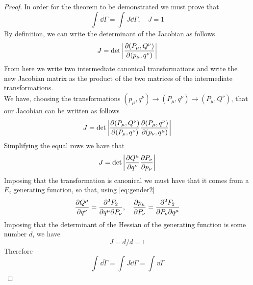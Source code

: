 \documentclass[../admech.tex]{subfiles}
\begin{document}
\begin{proof}
	In order for the theorem to be demonstrated we must prove that
	\begin{equation*}
		\int_{}^{}\dd\tilde{\Gamma}=\int_{}^{}J\dd\Gamma,\quad J=1
	\end{equation*}
	By definition, we can write the determinant of the Jacobian as follows
	\begin{equation*}
		J=\det\abs{\pdv{(P_\mu,Q^\nu)}{(p_\mu,q^\nu)}}
	\end{equation*}
	From here we write two intermediate canonical transformations and write the new Jacobian matrix as the product of the two matrices of the intermediate transformations.\\
	We have, choosing the transformations $(p_\mu,q^\nu)\to(P_\mu,q^\nu)\to(P_\mu,Q^\nu)$, that our Jacobian can be written as follows
	\begin{equation*}
		J=\det\abs{\pdv{(P_\mu,Q^\nu)}{(P_\mu,q^\nu)}\pdv{(P_\mu,q^\nu)}{(p_\nu,q^\mu)}}
	\end{equation*}
	Simplifying the equal rows we have that
	\begin{equation*}
		J=\det\abs{\pdv{Q^\mu}{q^\nu}\pdv{P_\nu}{p_\mu}}
	\end{equation*}
	Imposing that the transformation is canonical we must have that it comes from a $F_2$ generating function, so that, using \eqref{eq:gender2}
	\begin{equation*}
		\pdv{Q^\mu}{q^\nu}=\pdv{F_2}{q^\mu}{P_\nu},\quad\pdv{p_\mu}{P_\nu}=\pdv{F_2}{P_\nu}{q^\mu}
	\end{equation*}
	Imposing that the determinant of the Hessian of the generating function is some number $d$, we have
	\begin{equation*}
		J=d/d=1
	\end{equation*}
	Therefore
	\begin{equation*}
		\int_{}^{}\dd\tilde{\Gamma}=\int_{}^{}J\dd\Gamma=\int_{}^{}\dd\Gamma
	\end{equation*}
\end{proof}
\end{document}
